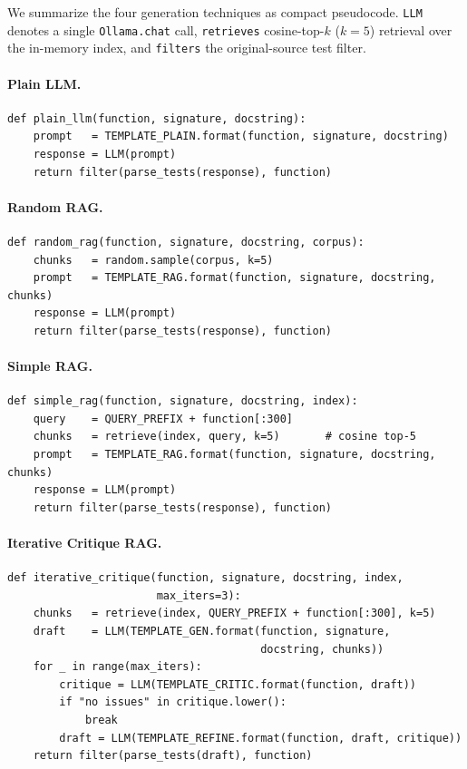 \documentclass[smallextended]{svjour3}
\begin{document}
We summarize the four generation techniques as compact
pseudocode. \texttt{LLM} denotes a single
\texttt{Ollama.chat} call, \texttt{retrieves} cosine-top-$k$ ($k=5$)
retrieval over the in-memory index, and \texttt{filters}
the original-source test filter.

\paragraph{Plain LLM.}
\begin{verbatim}
def plain_llm(function, signature, docstring):
    prompt   = TEMPLATE_PLAIN.format(function, signature, docstring)
    response = LLM(prompt)
    return filter(parse_tests(response), function)
\end{verbatim}

\paragraph{Random RAG.}
\begin{verbatim}
def random_rag(function, signature, docstring, corpus):
    chunks   = random.sample(corpus, k=5)
    prompt   = TEMPLATE_RAG.format(function, signature, docstring, chunks)
    response = LLM(prompt)
    return filter(parse_tests(response), function)
\end{verbatim}

\paragraph{Simple RAG.}
\begin{verbatim}
def simple_rag(function, signature, docstring, index):
    query    = QUERY_PREFIX + function[:300]
    chunks   = retrieve(index, query, k=5)       # cosine top-5
    prompt   = TEMPLATE_RAG.format(function, signature, docstring, chunks)
    response = LLM(prompt)
    return filter(parse_tests(response), function)
\end{verbatim}

\paragraph{Iterative Critique RAG.}
\begin{verbatim}
def iterative_critique(function, signature, docstring, index,
                       max_iters=3):
    chunks   = retrieve(index, QUERY_PREFIX + function[:300], k=5)
    draft    = LLM(TEMPLATE_GEN.format(function, signature,
                                       docstring, chunks))
    for _ in range(max_iters):
        critique = LLM(TEMPLATE_CRITIC.format(function, draft))
        if "no issues" in critique.lower():
            break
        draft = LLM(TEMPLATE_REFINE.format(function, draft, critique))
    return filter(parse_tests(draft), function)
\end{verbatim}
\end{document}
